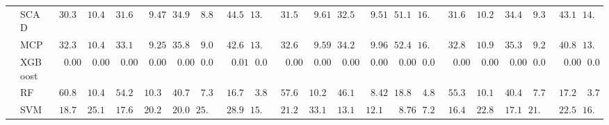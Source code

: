 \begin{tabular}{p{0.2cm}p{1cm}|p{0.6cm}p{0.6cm}|p{0.6cm}p{0.6cm}p{0.6cm}p{0.6cm}p{0.6cm}p{0.6cm}|p{0.6cm}p{0.6cm}p{0.6cm}p{0.6cm}p{0.6cm}p{0.6cm}|p{0.6cm}p{0.6cm}p{0.6cm}p{0.6cm}p{0.6cm}p{0.6cm}}
 & SCAD  & $\phantom{0}30.37$ & $\phantom{0}10.42$ & $\phantom{0}31.64$ & $\phantom{00}9.47$ & $\phantom{0}34.94$ & $\phantom{0}8.88$ & $\phantom{0}44.55$ & $13.66$ & $\phantom{0}31.53$ & $\phantom{00}9.61$ & $\phantom{0}32.52$ & $\phantom{00}9.51$ & $\phantom{0}51.15$ & $16.15$ & $\phantom{0}31.62$ & $\phantom{0}10.25$ & $\phantom{0}34.49$ & $\phantom{0}9.33$ & $\phantom{0}43.19$ & $14.24$ \\
 & MCP  & $\phantom{0}32.38$ & $\phantom{0}10.46$ & $\phantom{0}33.11$ & $\phantom{00}9.25$ & $\phantom{0}35.83$ & $\phantom{0}9.05$ & $\phantom{0}42.64$ & $13.87$ & $\phantom{0}32.65$ & $\phantom{00}9.59$ & $\phantom{0}34.21$ & $\phantom{00}9.96$ & $\phantom{0}52.48$ & $16.07$ & $\phantom{0}32.86$ & $\phantom{0}10.99$ & $\phantom{0}35.38$ & $\phantom{0}9.23$ & $\phantom{0}40.86$ & $13.13$ \\
 & XGBoost  & $\phantom{00}0.00$ & $\phantom{00}0.00$ & $\phantom{00}0.00$ & $\phantom{00}0.00$ & $\phantom{00}0.00$ & $\phantom{0}0.00$ & $\phantom{00}0.01$ & $\phantom{0}0.02$ & $\phantom{00}0.00$ & $\phantom{00}0.00$ & $\phantom{00}0.00$ & $\phantom{00}0.00$ & $\phantom{00}0.00$ & $\phantom{0}0.00$ & $\phantom{00}0.00$ & $\phantom{00}0.00$ & $\phantom{00}0.00$ & $\phantom{0}0.00$ & $\phantom{00}0.00$ & $\phantom{0}0.00$ \\
 & RF  & $\phantom{0}60.87$ & $\phantom{0}10.44$ & $\phantom{0}54.21$ & $\phantom{0}10.32$ & $\phantom{0}40.78$ & $\phantom{0}7.32$ & $\phantom{0}16.77$ & $\phantom{0}3.82$ & $\phantom{0}57.69$ & $\phantom{0}10.29$ & $\phantom{0}46.13$ & $\phantom{00}8.42$ & $\phantom{0}18.81$ & $\phantom{0}4.88$ & $\phantom{0}55.32$ & $\phantom{0}10.18$ & $\phantom{0}40.47$ & $\phantom{0}7.73$ & $\phantom{0}17.23$ & $\phantom{0}3.76$ \\
 & SVM  & $\phantom{0}18.70$ & $\phantom{0}25.14$ & $\phantom{0}17.62$ & $\phantom{0}20.26$ & $\phantom{0}20.01$ & $25.63$ & $\phantom{0}28.93$ & $15.98$ & $\phantom{0}21.28$ & $\phantom{0}33.19$ & $\phantom{0}13.15$ & $\phantom{0}12.11$ & $\phantom{00}8.76$ & $\phantom{0}7.26$ & $\phantom{0}16.49$ & $\phantom{0}22.80$ & $\phantom{0}17.19$ & $21.10$ & $\phantom{0}22.57$ & $16.59$ \\
\hline 
\end{tabular}


